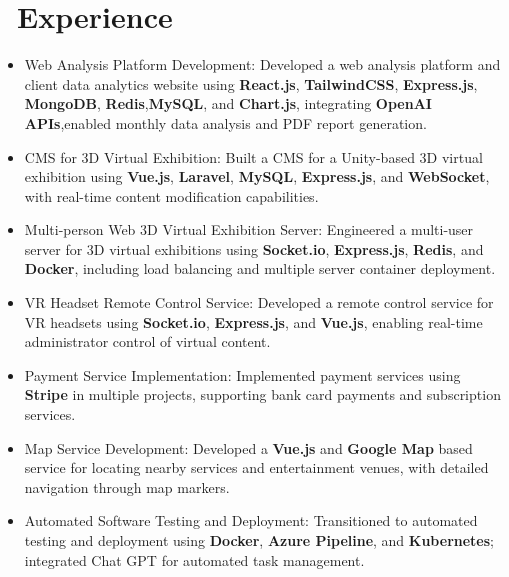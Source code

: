 \documentclass{resume}
\begin{document}
\section{\faUsers\ Experience}
\begin{itemize}[noitemsep]
  \item Web Analysis Platform Development: Developed a web analysis platform and client data analytics website using \textbf{React.js}, \textbf{TailwindCSS}, \textbf{Express.js}, \textbf{MongoDB}, \textbf{Redis},\textbf{MySQL}, and \textbf{Chart.js}, integrating \textbf{OpenAI APIs},enabled monthly data analysis and PDF report generation.
  \item CMS for 3D Virtual Exhibition: Built a CMS for a Unity-based 3D virtual exhibition using \textbf{Vue.js}, \textbf{Laravel}, \textbf{MySQL}, \textbf{Express.js}, and \textbf{WebSocket}, with real-time content modification capabilities.
  \item Multi-person Web 3D Virtual Exhibition Server: Engineered a multi-user server for 3D virtual exhibitions using \textbf{Socket.io}, \textbf{Express.js}, \textbf{Redis}, and \textbf{Docker}, including load balancing and multiple server container deployment.
  \item VR Headset Remote Control Service: Developed a remote control service for VR headsets using \textbf{Socket.io}, \textbf{Express.js}, and \textbf{Vue.js}, enabling real-time administrator control of virtual content.
  \item Payment Service Implementation: Implemented payment services using \textbf{Stripe} in multiple projects, supporting bank card payments and subscription services.
  \item Map Service Development: Developed a \textbf{Vue.js} and \textbf{Google Map} based service for locating nearby services and entertainment venues, with detailed navigation through map markers.
  \item Automated Software Testing and Deployment: Transitioned to automated testing and deployment using \textbf{Docker}, \textbf{Azure Pipeline}, and \textbf{Kubernetes}; integrated Chat GPT for automated task management.
\end{itemize}
\end{document}
